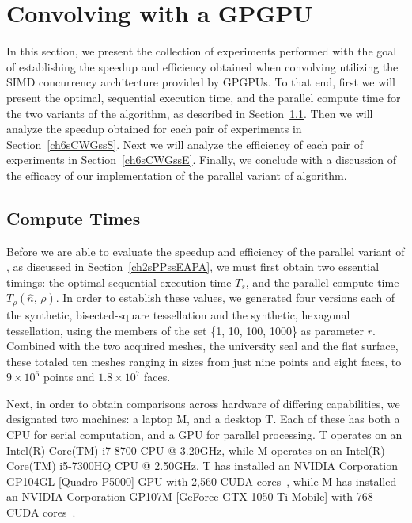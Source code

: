 \section{Convolving with a GPGPU}
\label{ch6sCWG}
In this section, we present the collection of experiments performed with the goal of establishing the speedup and efficiency obtained when convolving  utilizing the \gls{SIMD} concurrency architecture provided by \glspl{GPGPU}. To that end, first we will present the optimal, sequential execution time, and the parallel compute time for the two variants of the  algorithm, as described in Section~\ref{ch6sCWGssCT}. Then we will analyze the speedup obtained for each pair of experiments in Section~\ref{ch6sCWGssS}. Next we will analyze the efficiency of each pair of experiments in Section~\ref{ch6sCWGssE}. Finally, we conclude with a discussion of the efficacy of our implementation of the parallel variant of  algorithm.

%
%
%
%
\subsection{Compute Times}
\label{ch6sCWGssCT}
Before we are able to evaluate the \gls{speedup} and \gls{efficiency} of the parallel variant of , as discussed in Section~\ref{ch2sPPssEAPA}, we must first obtain two essential timings: the optimal sequential execution time $\mathit{T_s}$, and the parallel compute time $\mathit{T_{\rho}}(\hat{n},\,\rho)$. In order to establish these values, we generated four versions each of the synthetic, bisected-square tessellation and the synthetic, hexagonal tessellation, using the members of the set \{1, 10, 100, 1000\} as parameter $r$. Combined with the two acquired meshes, the university seal and the flat surface, these totaled ten meshes ranging in sizes from just nine points and eight faces, to $9\times 10^6$ points and $1.8\times 10^7$ faces.

Next, in order to obtain comparisons across hardware of differing capabilities, we designated two machines: a laptop M, and a desktop T. Each of these has both a CPU for serial computation, and a GPU for parallel processing. T operates on an Intel(R) Core(TM) i7-8700 CPU @ 3.20GHz, while M operates on an Intel(R) Core(TM) i5-7300HQ CPU @ 2.50GHz. T has installed an NVIDIA Corporation GP104GL [Quadro P5000] GPU with 2,560 CUDA cores~\cite{quadro5k}, while M has installed an NVIDIA Corporation GP107M [GeForce GTX 1050 Ti Mobile] with 768 CUDA cores~\cite{geforce1050}.

